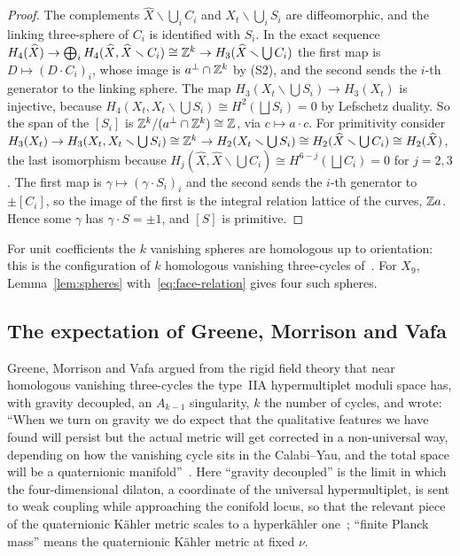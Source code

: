 \begin{proof}
The complements $\widehat X\smallsetminus\bigcup_iC_i$ and $X_t\smallsetminus\bigcup_iS_i$ are
diffeomorphic, and the linking three-sphere of $C_i$ is identified with $S_i$. In the exact sequence
$H_4(\widehat X)\to\bigoplus_iH_4(\widehat X,\widehat X\smallsetminus C_i)\cong\mathbb Z^k\to
H_3(\widehat X\smallsetminus\textstyle\bigcup C_i)$ the first map is $D\mapsto(D\cdot C_i)_i$, whose
image is $a^\perp\cap\mathbb Z^k$ by (S2), and the second sends the $i$-th generator to the linking
sphere. The map $H_3(X_t\smallsetminus\bigcup S_i)\to H_3(X_t)$ is injective, because
$H_4(X_t,X_t\smallsetminus\bigcup S_i)\cong H^2(\bigsqcup S_i)=0$ by Lefschetz duality. So the span of
the $[S_i]$ is $\mathbb Z^k/(a^\perp\cap\mathbb Z^k)\cong\mathbb Z$, via $c\mapsto a\cdot c$. For primitivity consider
$H_3(X_t)\to H_3(X_t,X_t\smallsetminus\bigcup S_i)\cong\mathbb Z^k\to H_2(X_t\smallsetminus\bigcup S_i)\cong
H_2(\widehat X\smallsetminus\bigcup C_i)\cong H_2(\widehat X)$, the last isomorphism because
$H_j(\widehat X,\widehat X\smallsetminus\bigcup C_i)\cong H^{6-j}(\bigsqcup C_i)=0$ for $j=2,3$. The first map
is $\gamma\mapsto(\gamma\cdot S_i)_i$ and the second sends the $i$-th generator to $\pm[C_i]$, so the image
of the first is the integral relation lattice of the curves, $\mathbb Z a$. Hence some $\gamma$ has
$\gamma\cdot S=\pm1$, and $[S]$ is primitive.
\end{proof}

For unit coefficients the $k$ vanishing spheres are homologous up to orientation: this is the
configuration of $k$ homologous vanishing three-cycles of~\cite{OoguriVafa:1996,Greene:1996Confinement}.
For $X_9$, Lemma~\ref{lem:spheres} with~\eqref{eq:face-relation} gives four such spheres.

\subsection{The expectation of Greene, Morrison and Vafa}
\label{subsec:gmv}

Greene, Morrison and Vafa argued from the rigid field theory that near homologous vanishing three-cycles
the type~IIA hypermultiplet moduli space has, with gravity decoupled, an $A_{k-1}$ singularity, $k$ the
number of cycles, and wrote: ``When we turn on gravity we do expect that the qualitative features we have
found will persist but the actual metric will get corrected in a non-universal way, depending on how the
vanishing cycle sits in the Calabi--Yau, and the total space will be a quaternionic
manifold''~\cite[Sect.~6]{Greene:1996Confinement}. Here ``gravity decoupled'' is the limit in which the
four-dimensional dilaton, a coordinate of the universal hypermultiplet, is sent to weak coupling while
approaching the conifold locus, so that the relevant piece of the quaternionic K\"ahler metric scales to a
hyperk\"ahler one~\cite[Sect.~6]{Greene:1996Confinement}; ``finite Planck mass'' means the quaternionic
K\"ahler metric at fixed $\nu$.

